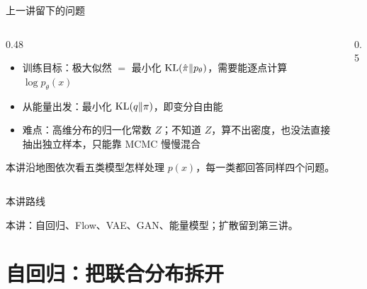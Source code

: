\documentclass[aspectratio=169,10pt,UTF8,fontset=none]{ctexbeamer}
\subtitle{第二讲\quad 处理 $p(x)$ 的五种方式}
\begin{document}
\begin{frame}[plain]
  \titlepage
\end{frame}

\begin{frame}{上一讲留下的问题}
  \begin{columns}[T]
    \begin{column}{0.48\textwidth}
      \begin{itemize}
        \item 训练目标：极大似然 $=$ 最小化 $\mathrm{KL}(\hat\pi\Vert p_\theta)$，需要能逐点计算 $\log p_\theta(x)$
        \item 从能量出发：最小化 $\mathrm{KL}(q\Vert\pi)$，即变分自由能
        \item 难点：高维分布的归一化常数 $Z$；不知道 $Z$，算不出密度，也没法直接抽出独立样本，只能靠 MCMC 慢慢混合
      \end{itemize}
      \vspace{2mm}
      本讲沿地图依次看五类模型怎样处理 $p(x)$，每一类都回答同样四个问题。
    \end{column}
    \begin{column}{0.5\textwidth}
      \centering
    \end{column}
  \end{columns}
\end{frame}

\begin{frame}{本讲路线}
  \centering
  
  \vfill
  {\small 本讲：自回归、Flow、VAE、GAN、能量模型；扩散留到第三讲。}
\end{frame}

\section{自回归：把联合分布拆开}
\end{document}
